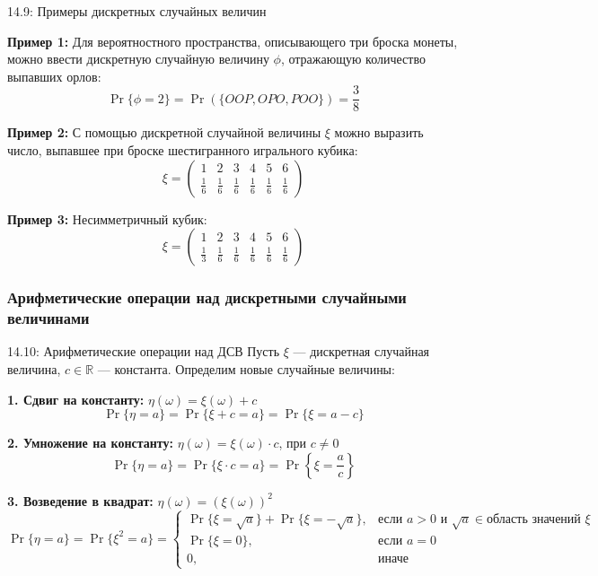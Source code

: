 \documentclass[a4paper,12pt]{article}
\begin{document}
	\begin{examplebox}{14.9: Примеры дискретных случайных величин}
		
		\textbf{Пример 1:} Для вероятностного пространства, описывающего три броска монеты, можно ввести дискретную случайную величину \(\phi\), отражающую количество выпавших орлов:
		\[ \Pr\{\phi = 2\} = \Pr(\{OOP, OPO, POO\}) = \frac{3}{8} \]
		
		\textbf{Пример 2:} С помощью дискретной случайной величины \(\xi\) можно выразить число, выпавшее при броске шестигранного игрального кубика:
		\[ \xi = \begin{pmatrix}
			1 & 2 & 3 & 4 & 5 & 6 \\
			\frac{1}{6} & \frac{1}{6} & \frac{1}{6} & \frac{1}{6} & \frac{1}{6} & \frac{1}{6}
		\end{pmatrix} \]
		
		\textbf{Пример 3:} Несимметричный кубик:
		\[ \xi = \begin{pmatrix}
			1 & 2 & 3 & 4 & 5 & 6 \\
			\frac{1}{3} & \frac{1}{6} & \frac{1}{6} & \frac{1}{6} & \frac{1}{6} & \frac{1}{6}
		\end{pmatrix} \]
	\end{examplebox}
	
	\subsubsection{Арифметические операции над дискретными случайными величинами}
	
	\begin{propertybox}{14.10: Арифметические операции над ДСВ}
		Пусть \(\xi\) — дискретная случайная величина, \(c \in \mathbb{R}\) — константа. Определим новые случайные величины:
		
		\textbf{1. Сдвиг на константу:} \(\eta(\omega) = \xi(\omega) + c\)
		\[ \Pr\{\eta = a\} = \Pr\{\xi + c = a\} = \Pr\{\xi = a - c\} \]
		
		\textbf{2. Умножение на константу:} \(\eta(\omega) = \xi(\omega) \cdot c\), при \(c \neq 0\)
		\[ \Pr\{\eta = a\} = \Pr\{\xi \cdot c = a\} = \Pr\left\{\xi = \frac{a}{c}\right\} \]
		
		\textbf{3. Возведение в квадрат:} \(\eta(\omega) = (\xi(\omega))^2\)
		\[ \Pr\{\eta = a\} = \Pr\{\xi^2 = a\} = \begin{cases}
			\Pr\{\xi = \sqrt{a}\} + \Pr\{\xi = -\sqrt{a}\}, & \text{если } a > 0 \text{ и } \sqrt{a} \in \text{область значений } \xi \\
			\Pr\{\xi = 0\}, & \text{если } a = 0 \\
			0, & \text{иначе}
		\end{cases} \]
	\end{propertybox}
	
\end{document}
